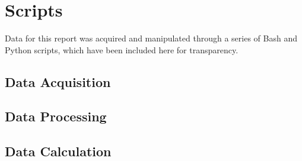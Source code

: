 \documentclass{article}
\begin{document}
\appendix

\section{Scripts}
Data for this report was acquired and manipulated through a series of Bash and
Python scripts, which have been included here for transparency.

\subsection{Data Acquisition}
\begin{center}
	\parbox{.85\textwidth}{
	}
\end{center}

\subsection{Data Processing}
\begin{center}
	\parbox{.85\textwidth}{
	}
\end{center}

\subsection{Data Calculation}
\begin{center}
	\parbox{.85\textwidth}{
	}
\end{center}
\end{document}
